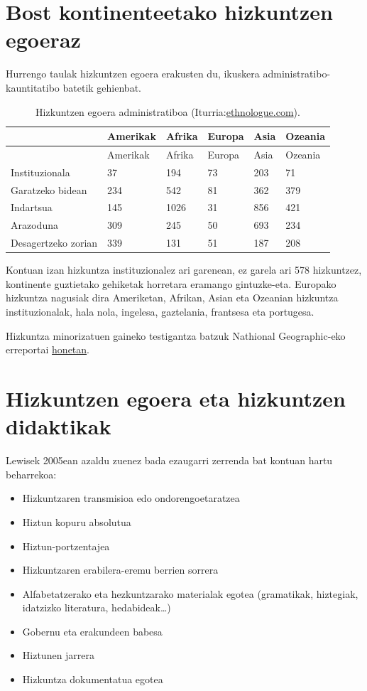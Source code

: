 \documentclass[]{book}
\providecommand{\tightlist}{%
  \setlength{\itemsep}{0pt}\setlength{\parskip}{0pt}}
\begin{document}
\hypertarget{bost-kontinenteetako-hizkuntzen-egoeraz}{%
\section{Bost kontinenteetako hizkuntzen egoeraz}\label{bost-kontinenteetako-hizkuntzen-egoeraz}}

Hurrengo taulak hizkuntzen egoera erakusten du, ikuskera administratibo-kauntitatibo batetik gehienbat.

\begin{longtable}[]{@{}llllll@{}}
\caption{Hizkuntzen egoera administratiboa (Iturria:\href{https://www.ethnologue.com/}{ethnologue.com}).}\tabularnewline
\toprule
& Amerikak & Afrika & Europa & Asia & Ozeania\tabularnewline
\midrule
\endfirsthead
\toprule
& Amerikak & Afrika & Europa & Asia & Ozeania\tabularnewline
\midrule
\endhead
Instituzionala & 37 & 194 & 73 & 203 & 71\tabularnewline
Garatzeko bidean & 234 & 542 & 81 & 362 & 379\tabularnewline
Indartsua & 145 & 1026 & 31 & 856 & 421\tabularnewline
Arazoduna & 309 & 245 & 50 & 693 & 234\tabularnewline
Desagertzeko zorian & 339 & 131 & 51 & 187 & 208\tabularnewline
\bottomrule
\end{longtable}

Kontuan izan hizkuntza instituzionalez ari garenean, ez garela ari 578 hizkuntzez, kontinente guztietako gehiketak horretara eramango gintuzke-eta. Europako hizkuntza nagusiak dira Ameriketan, Afrikan, Asian eta Ozeanian hizkuntza instituzionalak, hala nola, ingelesa, gaztelania, frantsesa eta portugesa.

Hizkuntza minorizatuen gaineko testigantza batzuk Nathional Geographic-eko erreportai \href{http://www.nationalgeographic.com.es/mundo-ng/grandes-reportajes/lenguas-peligro-extincion_6174/26}{honetan}.

\hypertarget{hizkuntzen-egoera-eta-hizkuntzen-didaktikak}{%
\section{Hizkuntzen egoera eta hizkuntzen didaktikak}\label{hizkuntzen-egoera-eta-hizkuntzen-didaktikak}}

Lewisek 2005ean azaldu zuenez bada ezaugarri zerrenda bat kontuan hartu beharrekoa:

\begin{itemize}
\tightlist
\item
  Hizkuntzaren transmisioa edo ondorengoetaratzea
\item
  Hiztun kopuru absolutua
\item
  Hiztun-portzentajea
\item
  Hizkuntzaren erabilera-eremu berrien sorrera
\item
  Alfabetatzerako eta hezkuntzarako materialak egotea (gramatikak, hiztegiak, idatzizko literatura, hedabideak\ldots{})
\item
  Gobernu eta erakundeen babesa
\item
  Hiztunen jarrera
\item
  Hizkuntza dokumentatua egotea
\end{itemize}
\end{document}
